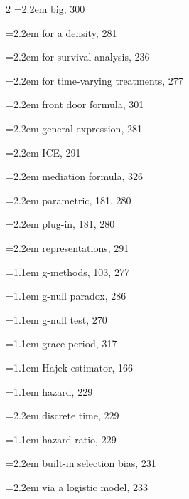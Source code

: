 \begin{multicols}{2}
\hspace*{1.1em}\hangindent=2.2em big, 300\par
\hspace*{1.1em}\hangindent=2.2em for a density, 281\par
\hspace*{1.1em}\hangindent=2.2em for survival analysis, 236\par
\hspace*{1.1em}\hangindent=2.2em for time-varying treatments, 277\par
\hspace*{1.1em}\hangindent=2.2em front door formula, 301\par
\hspace*{1.1em}\hangindent=2.2em general expression, 281\par
\hspace*{1.1em}\hangindent=2.2em ICE, 291\par
\hspace*{1.1em}\hangindent=2.2em mediation formula, 326\par
\hspace*{1.1em}\hangindent=2.2em parametric, 181, 280\par
\hspace*{1.1em}\hangindent=2.2em plug-in, 181, 280\par
\hspace*{1.1em}\hangindent=2.2em representations, 291\par
\hangindent=1.1em g-methods, 103, 277\par
\hangindent=1.1em g-null paradox, 286\par
\hangindent=1.1em g-null test, 270\par
\hangindent=1.1em grace period, 317\par
\hangindent=1.1em Hajek estimator, 166\par
\hangindent=1.1em hazard, 229\par
\hspace*{1.1em}\hangindent=2.2em discrete time, 229\par
\hangindent=1.1em hazard ratio, 229\par
\hspace*{1.1em}\hangindent=2.2em built-in selection bias, 231\par
\hspace*{1.1em}\hangindent=2.2em via a logistic model, 233\par

\end{multicols}
